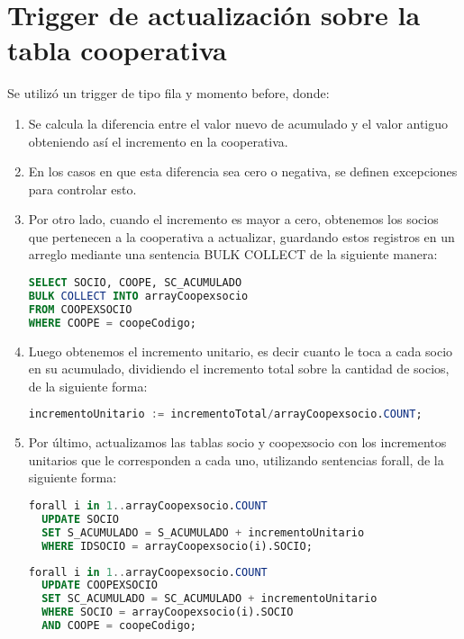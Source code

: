 \documentclass{article}
\begin{document}
\section{Trigger de actualización sobre la tabla cooperativa}
Se utilizó un trigger de tipo fila y momento before, donde:
\begin{enumerate}
        \item Se calcula la diferencia entre el valor nuevo de acumulado y el valor antiguo obteniendo así el incremento en la cooperativa.
        \item En los casos en que esta diferencia sea cero o negativa, se definen excepciones para controlar esto.
        \item Por otro lado, cuando el incremento es mayor a cero, obtenemos los socios que pertenecen a la cooperativa a actualizar, guardando estos registros en un arreglo mediante una sentencia BULK COLLECT de la siguiente manera:
\begin{lstlisting}[language=SQL]
SELECT SOCIO, COOPE, SC_ACUMULADO 
BULK COLLECT INTO arrayCoopexsocio
FROM COOPEXSOCIO
WHERE COOPE = coopeCodigo;
\end{lstlisting}
\item Luego obtenemos el incremento unitario, es decir cuanto le toca a cada socio en su acumulado, dividiendo el incremento total sobre la cantidad de socios, de la siguiente forma:

\begin{lstlisting}[language=SQL]
incrementoUnitario := incrementoTotal/arrayCoopexsocio.COUNT;
\end{lstlisting}
\item Por último, actualizamos las tablas socio y coopexsocio con los incrementos unitarios que le corresponden a cada uno, utilizando sentencias forall, de la siguiente forma:
\begin{lstlisting}[language=SQL]
forall i in 1..arrayCoopexsocio.COUNT
  UPDATE SOCIO 
  SET S_ACUMULADO = S_ACUMULADO + incrementoUnitario
  WHERE IDSOCIO = arrayCoopexsocio(i).SOCIO;

\end{lstlisting}
\begin{lstlisting}[language=SQL]
forall i in 1..arrayCoopexsocio.COUNT
  UPDATE COOPEXSOCIO 
  SET SC_ACUMULADO = SC_ACUMULADO + incrementoUnitario
  WHERE SOCIO = arrayCoopexsocio(i).SOCIO 
  AND COOPE = coopeCodigo;
\end{lstlisting}
\end{enumerate}
\end{document}
